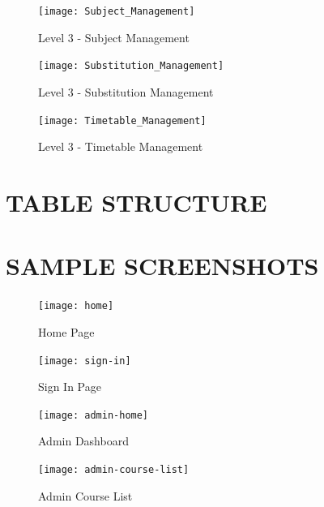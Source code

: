 \begin{figure}[!h]
	\begin{center}
		\texttt{[image: Subject\_Management]}
	\end{center}
\caption{Level 3 - Subject Management}
\end{figure}

\begin{figure}[!h]
	\begin{center}
		\texttt{[image: Substitution\_Management]}
	\end{center}
\caption{Level 3 - Substitution Management}
\end{figure}

\begin{figure}[!h]
	\begin{center}
		\texttt{[image: Timetable\_Management]}
	\end{center}
\caption{Level 3 - Timetable Management}
\end{figure}



\chapter{TABLE STRUCTURE}
%
%
%
\chapter{SAMPLE SCREENSHOTS}


\begin{figure}[!h]
	\begin{center}
		\texttt{[image: home]}
	\end{center}
\caption{Home Page}
\end{figure}

\begin{figure}[!h]
	\begin{center}
		\texttt{[image: sign-in]}
	\end{center}
\caption{Sign In Page}
\end{figure}

\begin{figure}[!h]
	\begin{center}
		\texttt{[image: admin-home]}
	\end{center}
\caption{Admin Dashboard}
\end{figure}

\begin{figure}[!h]
	\begin{center}
		\texttt{[image: admin-course-list]}
	\end{center}
\caption{Admin Course List}
\end{figure}

